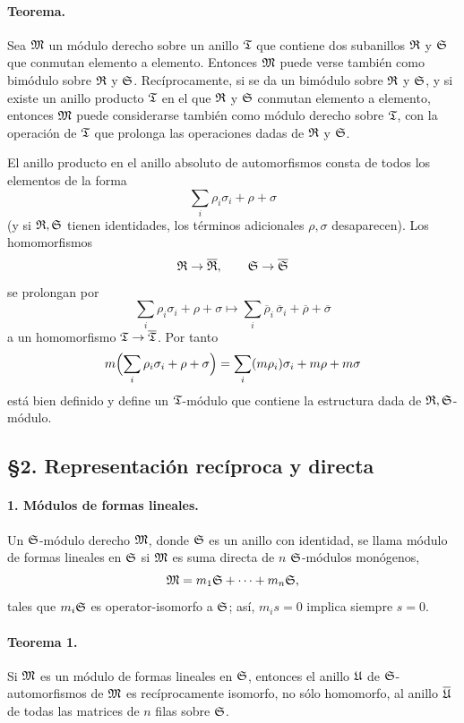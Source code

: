 \paragraph{Teorema.}
Sea \(\mathfrak M\) un módulo derecho sobre un anillo \(\mathfrak T\) que contiene dos subanillos \(\mathfrak R\) y \(\mathfrak S\) que conmutan elemento a elemento. Entonces \(\mathfrak M\) puede verse también como bimódulo sobre \(\mathfrak R\) y \(\mathfrak S\). Recíprocamente, si se da un bimódulo sobre \(\mathfrak R\) y \(\mathfrak S\), y si existe un anillo producto \(\mathfrak T\) en el que \(\mathfrak R\) y \(\mathfrak S\) conmutan elemento a elemento, entonces \(\mathfrak M\) puede considerarse también como módulo derecho sobre \(\mathfrak T\), con la operación de \(\mathfrak T\) que prolonga las operaciones dadas de \(\mathfrak R\) y \(\mathfrak S\).

El anillo producto en el anillo absoluto de automorfismos consta de todos los elementos de la forma
\[
        \sum_i \rho_i\sigma_i+\rho+\sigma
\]
(y si \(\mathfrak R,\mathfrak S\) tienen identidades, los términos adicionales \(\rho,\sigma\) desaparecen). Los homomorfismos
\[
        \mathfrak R\to\overline{\mathfrak R},\qquad \mathfrak S\to\overline{\mathfrak S}
\]
se prolongan por
\[
        \sum_i \rho_i\sigma_i+\rho+\sigma
        \longmapsto
        \sum_i \overline\rho_i\,\overline\sigma_i+\overline\rho+\overline\sigma
\]
a un homomorfismo \(\mathfrak T\to\overline{\mathfrak T}\). Por tanto
\[
        m\Bigl(\sum_i \rho_i\sigma_i+\rho+\sigma\Bigr)
        =\sum_i (m\rho_i)\sigma_i+m\rho+m\sigma
\]
está bien definido y define un \(\mathfrak T\)-módulo que contiene la estructura dada de \(\mathfrak R,\mathfrak S\)-módulo.

\subsection*{§2. Representación recíproca y directa}

\paragraph{1. Módulos de formas lineales.}
Un \(\mathfrak S\)-módulo derecho \(\mathfrak M\), donde \(\mathfrak S\) es un anillo con identidad, se llama módulo de formas lineales en \(\mathfrak S\) si \(\mathfrak M\) es suma directa de \(n\) \(\mathfrak S\)-módulos monógenos,
\[
        \mathfrak M=m_1\mathfrak S+\cdots+m_n\mathfrak S,
\]
tales que \(m_i\mathfrak S\) es operator-isomorfo a \(\mathfrak S\); así, \(m_i s=0\) implica siempre \(s=0\).

\paragraph{Teorema 1.}
Si \(\mathfrak M\) es un módulo de formas lineales en \(\mathfrak S\), entonces el anillo \(\mathfrak U\) de \(\mathfrak S\)-automorfismos de \(\mathfrak M\) es recíprocamente isomorfo, no sólo homomorfo, al anillo \(\overline{\mathfrak U}\) de todas las matrices de \(n\) filas sobre \(\mathfrak S\).

